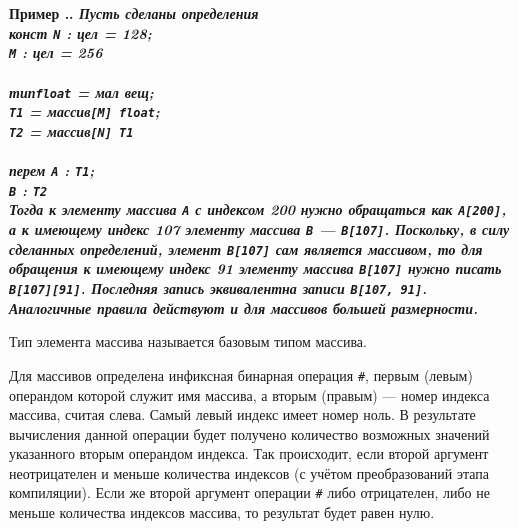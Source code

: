 \documentclass[10pt]{report}
\newcounter{exam}[section]
\renewcommand{\theexam}{\thesection.\arabic{exam}}
\newenvironment{Example}{\par\refstepcounter{exam}\bf Пример \theexam. \sl}{\rm\par}
\begin{document}
\begin{Example} \textit{Пусть сделаны определения}\\
\rm
\textbf{конст} \texttt{N} : \textbf{цел} = 128;\\
\hspace*{10mm} \texttt{M} : \textbf{цел} = 256\\
\\
\textbf{тип}\hspace*{5mm}\texttt{float} = \textbf{мал вещ};\\
\hspace*{12mm}\texttt{T1} = \textbf{массив}\texttt{[M] float};\\
\hspace*{12mm}\texttt{T2} = \textbf{массив}\texttt{[N] T1}\\
\\
\textbf{перем} \texttt{A} : \texttt{T1};\\
\hspace*{11mm} \texttt{B} : \texttt{T2}
\\
\textit{Тогда к элементу массива \texttt{A} с индексом 200 нужно обращаться как \texttt{A[200]}, а к имеющему индекс 107 элементу массива \texttt{B} --- \texttt{B[107]}.
Поскольку, в силу сделанных определений, элемент \texttt{B[107]} сам является массивом, то для обращения к имеющему индекс 91 элементу массива \texttt{B[107]} нужно писать
\texttt{B[107][91]}. Последняя запись эквивалентна записи \texttt{B[107, 91]}. Аналогичные правила действуют и для массивов большей размерности.}
\end{Example}

Тип элемента массива называется базовым типом массива.

Для массивов определена инфиксная бинарная операция \texttt{\#}, первым (левым) операндом которой служит имя массива, а вторым (правым) --- номер индекса массива, считая слева.
Самый левый индекс имеет номер ноль. В результате вычисления данной операции будет получено количество возможных значений указанного вторым операндом индекса. Так происходит,
если второй аргумент неотрицателен и меньше количества индексов (с учётом преобразований этапа компиляции). Если же второй аргумент операции \texttt{\#} либо отрицателен, либо
не меньше количества индексов массива, то результат будет равен нулю.
\end{document}
